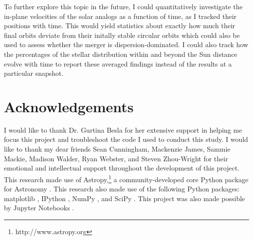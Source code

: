 \documentclass{aastex63}
\begin{document}
To further explore this topic in the future, I could quantitatively investigate the in-plane velocities of the solar analogs as a function of time, as I tracked their positions with time. This would yield statistics about exactly how much their final orbits deviate from their initally stable circular orbits which could also be used to assess whether the merger is dispersion-dominated. I could also track how the percentages of the stellar distribution within and beyond the Sun distance evolve with time to report these averaged findings instead of the results at a particular snapshot.

\section{Acknowledgements}
I would like to thank Dr. Gurtina Besla for her extensive support in helping me focus this project and troubleshoot the code I used to conduct this study. I would like to thank my dear friends Sean Cunningham, Mackenzie James, Sammie Mackie, Madison Walder, Ryan Webster, and Steven Zhou-Wright for their emotional and intellectual support throughout the development of this project. This research made use of Astropy,\footnote{http://www.astropy.org} a community-developed core Python package for Astronomy \citep{astropy:2013, astropy:2018}. This research also made use of the following Python packages: matplotlib \citep{Hunter:2007}, IPython \citep{PER-GRA:2007}, NumPy \citep{5725236}, and SciPy \citep{2020SciPy-NMeth}. This project was also made possible by Jupyter Notebooks \citep{Kluyver2016JupyterN}. 

{}

\end{document}
